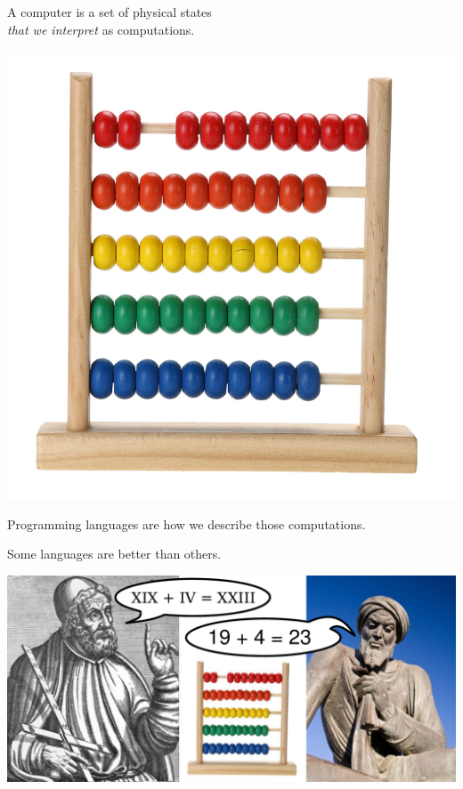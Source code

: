 \documentclass[aspectratio=169]{beamer}
\begin{document}
\begin{frame}{}
\LARGE
\vspace{1 cm}
\begin{center}
A computer is a set of physical states \\ {\it that we interpret} as computations.

\vspace{0.2 cm}
\includegraphics[width=0.4\linewidth]{abacus.jpg}
\end{center}
\end{frame}

\begin{frame}{Programming languages are how we describe those computations.}
\Large
\vspace{0.1 cm}
\begin{center}
Some languages are better than others.
\end{center}

\vspace{0.1 cm}
\includegraphics[width=\linewidth]{abacus_ptolemy_al-khwarizmi.pdf}
\end{frame}
\end{document}
